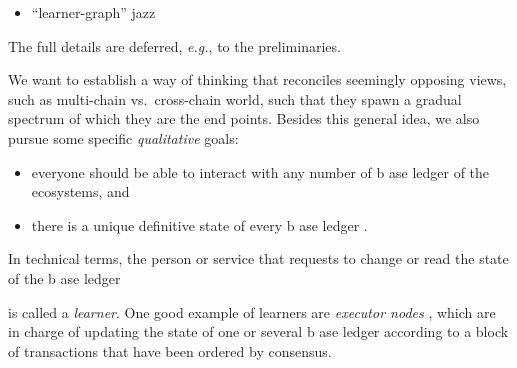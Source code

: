 \documentclass[%
dvipsnames,handout,draft]{article}
\theoremstyle{definition}
\newcommand{\base}[1][ ]{%
  b\ase[#1]%
}
\newcommand{\ase}[1][ ]{%
  ase ledger%
  \ifthenelse{\equal{#1}{ }}{}{#1}\xspace%
}
\newcommand{\eg}[1][, ]{\emph{e.g.}#1}
\begin{document}
{\begin{itemize}
{\begin{quote}
        Charlotte to serve as a […] general ADDS framework
        \\…\\
        Charlotte ADDSs can \emph{intersect}, or share blocks
        \\…\\
        “what is the least ordering we actually need?”
        \\…\\
        Charlotte provides a common framework for data structures from separate
        services to \ul{reference each other}.
        \\…\\
        Charlotte data structures are naturally composable: the \emph{union} of two data structures is itself a
        data structure
        \\…\\
        the \emph{intersection} of two data
        structures comprises the data that is part of both structures. We can think of \ul{cross-shard} transactions
        appended to a sharded blockchain ADDS as data in the intersection of multiple shard ADDSs.
      \end{quote}
    }%
  \item “learner-graph” jazz
  \end{itemize}
  The full details are deferred,
  \eg to the preliminaries. 
}



We want to establish a way of thinking that reconciles  %
seemingly opposing views, such as multi-chain vs.\ cross-chain world, %
such that they spawn a gradual spectrum of which they are the end points. %
Besides this general idea, %
we also pursue some specific \emph{qualitative} goals: %
\begin{itemize} %
  
\item everyone should be able to  interact with any number of \base[s] of the ecosystems, %
  and %
\item there is a unique definitive state of every \base.
\end{itemize}
In technical terms, %
the person or service that requests to change or read the state of the \base[s]
is called a \emph{learner}. %
One good example of learners are \emph{executor nodes} %
\cite{anoma_specs}, %
which are in charge of updating the state of one or several \base[s] %
according to a block of transactions that have been ordered by consensus. %
\end{document}
